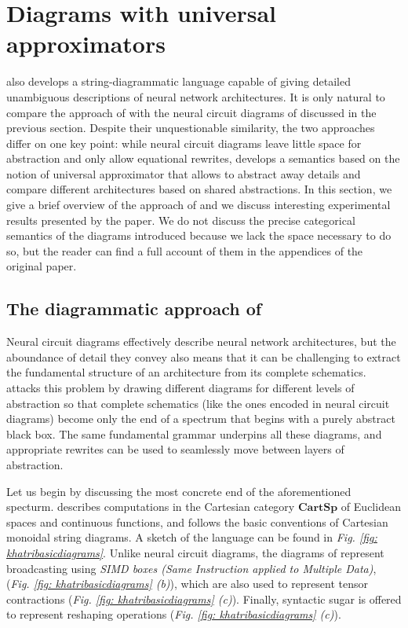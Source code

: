 \documentclass[11pt,a4paper,openright,twoside]{report}
\theoremstyle{plain}
\theoremstyle{definition}
\begin{document}
\section{Diagrams with universal approximators}

\cite{khatri2024anatomy} also develops a string-diagrammatic language capable of giving detailed unambiguous descriptions of neural network architectures. It is only natural to compare the approach of \cite{khatri2024anatomy} with the neural circuit diagrams of \cite{abbott2023robust} discussed in the previous section. Despite their unquestionable similarity, the two approaches differ on one key point: while neural circuit diagrams leave little space for abstraction and only allow equational rewrites, \cite{khatri2024anatomy} develops a semantics based on the notion of universal approximator that allows to abstract away details and compare different architectures based on shared abstractions. In this section, we give a brief overview of the approach of \cite{khatri2024anatomy} and we discuss interesting experimental results presented by the paper. We do not discuss the precise categorical semantics of the diagrams introduced \cite{khatri2024anatomy} because we lack the space necessary to do so, but the reader can find a full account of them in the appendices of the original paper. 

\subsection{The diagrammatic approach of \cite{khatri2024anatomy}}

Neural circuit diagrams effectively describe neural network architectures, but the aboundance of detail they convey also means that it can be challenging to extract the fundamental structure of an architecture from its complete schematics.
\cite{khatri2024anatomy} attacks this problem by drawing different diagrams for different levels of abstraction so that complete schematics (like the ones encoded in neural circuit diagrams) become only the end of a spectrum that begins with a purely abstract black box. The same fundamental grammar underpins all these diagrams, and appropriate rewrites can be used to seamlessly move between layers of abstraction. 

Let us begin by discussing the most concrete end of the aforementioned specturm. \cite{khatri2024anatomy} describes computations in the Cartesian category $\mathbf{CartSp}$ of Euclidean spaces and continuous functions, and follows the basic conventions of Cartesian monoidal string diagrams. A sketch of the language can be found in \textit{Fig. \ref{fig: khatribasicdiagrams}}. Unlike neural circuit diagrams, the diagrams of \cite{khatri2024anatomy} represent broadcasting using \textit{SIMD boxes (Same Instruction applied to Multiple Data)}, (\textit{Fig. \ref{fig: khatribasicdiagrams} (b)}), which are also used to represent tensor contractions (\textit{Fig. \ref{fig: khatribasicdiagrams} (c)}). Finally, syntactic sugar is offered to represent reshaping operations (\textit{Fig. \ref{fig: khatribasicdiagrams} (c)}).
\end{document}
